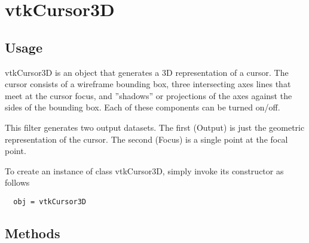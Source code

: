 \section{vtkCursor3D}

\subsection{Usage}

 vtkCursor3D is an object that generates a 3D representation of a cursor.
 The cursor consists of a wireframe bounding box, three intersecting 
 axes lines that meet at the cursor focus, and ''shadows'' or projections
 of the axes against the sides of the bounding box. Each of these
 components can be turned on/off.

 This filter generates two output datasets. The first (Output) is just the 
 geometric representation of the cursor. The second (Focus) is a single
 point at the focal point.

To create an instance of class vtkCursor3D, simply
invoke its constructor as follows
\begin{verbatim}
  obj = vtkCursor3D
\end{verbatim}
\subsection{Methods}

